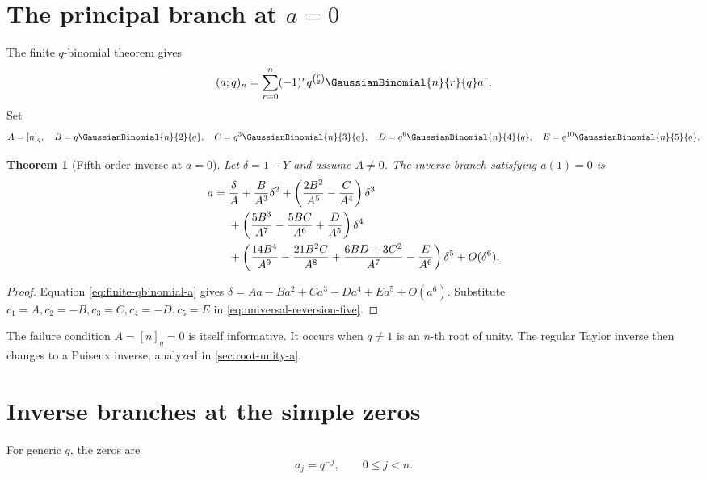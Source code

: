 \documentclass[11pt,a4paper,oneside,openany]{book}
\newtheorem{theorem}{Theorem}[chapter]
\theoremstyle{definition}
\theoremstyle{remark}
\begin{document}
\section{The principal branch at \texorpdfstring{$a=0$}{a=0}}

The finite \(q\)-binomial theorem gives
\begin{equation}\label{eq:finite-qbinomial-a}
 (a;q)_n=\sum_{r=0}^{n}(-1)^r q^{\binom r2}\GaussianBinomial{n}{r}{q} a^r.
\end{equation}
Set
\[
 A=[n]_q,\quad B=q\GaussianBinomial{n}{2}{q},\quad C=q^3\GaussianBinomial{n}{3}{q},
 \quad D=q^6\GaussianBinomial{n}{4}{q},\quad E=q^{10}\GaussianBinomial{n}{5}{q}.
\]

\begin{theorem}[Fifth-order inverse at \(a=0\)]\label{thm:finite-a-zero-inverse}
Let \(\delta=1-Y\) and assume \(A\ne0\).  The inverse branch satisfying
\(a(1)=0\) is
\begin{align}
 a={}&\frac{\delta}{A}+\frac{B}{A^3}\delta^2
 +\left(\frac{2B^2}{A^5}-\frac{C}{A^4}\right)\delta^3\notag\\
 &+\left(\frac{5B^3}{A^7}-\frac{5BC}{A^6}+\frac{D}{A^5}\right)\delta^4\notag\\
 &+\left(\frac{14B^4}{A^9}-\frac{21B^2C}{A^8}
 +\frac{6BD+3C^2}{A^7}-\frac{E}{A^6}\right)\delta^5
 +O(\delta^6).
\label{eq:finite-a-zero-inverse}
\end{align}
\end{theorem}

\begin{proof}
Equation \eqref{eq:finite-qbinomial-a} gives
\(\delta=Aa-Ba^2+Ca^3-Da^4+Ea^5+O(a^6)\).  Substitute
\(c_1=A,c_2=-B,c_3=C,c_4=-D,c_5=E\) in
\eqref{eq:universal-reversion-five}.
\end{proof}

The failure condition \(A=[n]_q=0\) is itself informative.  It occurs when
\(q\ne1\) is an \(n\)-th root of unity.  The regular Taylor inverse then
changes to a Puiseux inverse, analyzed in \cref{sec:root-unity-a}.

\section{Inverse branches at the simple zeros}

For generic \(q\), the zeros are
\[
 a_j=q^{-j},\qquad 0\le j<n.
\]
\end{document}
